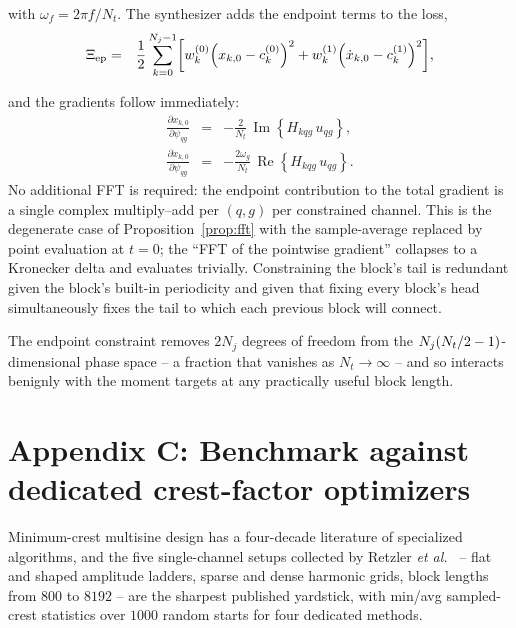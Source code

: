 \documentclass[10pt,a4paper]{article}
\numberwithin{equation}{section}
\DeclarePairedDelimiter\block{[}{]}
\DeclarePairedDelimiter\mat{(}{)}
\DeclareMathOperator{\Real}{Re}
\DeclareMathOperator{\Imag}{Im}
\newcommand{\re}[1]{\Real\left\{#1\right\}}
\newcommand{\im}[1]{\Imag\left\{#1\right\}}
\newcommand{\m}[1]{\mathrm{#1}}
\begin{document}
with $\omega_f = 2\pi f / N_t$. The synthesizer adds the endpoint terms to the loss,
\begin{eqnarray}
	\Xi_{\m{ep}} &=& \frac{1}{2}\sum_{k=0}^{N_j-1}
		\block*{  w^{(0)}_k\mat*{x_{k, 0} - c^{(0)}_k}^2 
			    + w^{(1)}_k\mat*{\dot x_{k, 0} - c^{(1)}_k}^2},
\end{eqnarray}

and the gradients follow immediately:
\begin{eqnarray}
	\frac{\partial x_{k, 0}}{\partial \psi_{q g}}      &=& -\frac{2}{N_t}\,\im{H_{k q g}\, u_{q g}}, \\
	\frac{\partial \dot x_{k, 0}}{\partial \psi_{q g}} &=& -\frac{2\omega_g}{N_t}\,\re{H_{k q g}\, u_{q g}}.
\end{eqnarray}
No additional FFT is required: the endpoint contribution to the total gradient is a single complex multiply--add per $(q,g)$ per constrained channel. This is the degenerate case of Proposition~\ref{prop:fft} with the sample-average replaced by point evaluation at $t{=}0$; the ``FFT of the pointwise gradient'' collapses to a Kronecker delta and evaluates trivially. Constraining the block's tail is redundant given the block's built-in periodicity and given that fixing every block's head simultaneously fixes the tail to which each previous block will connect.

The endpoint constraint removes $2 N_j$ degrees of freedom from the $N_j\mat{N_t/2-1}$-dimensional phase space -- a fraction that vanishes as $N_t\to\infty$ -- and so interacts benignly with the moment targets at any practically useful block length.

\section*{Appendix C: Benchmark against dedicated crest-factor optimizers}\label{app:crestbench}

Minimum-crest multisine design has a four-decade literature of specialized algorithms, and the five single-channel setups collected by Retzler \emph{et al.}~\cite{retzler2022crest} -- flat and shaped amplitude ladders, sparse and dense harmonic grids, block lengths from $800$ to $8192$ -- are the sharpest published yardstick, with min/avg sampled-crest statistics over $1000$ random starts for four dedicated methods. 
\end{document}
